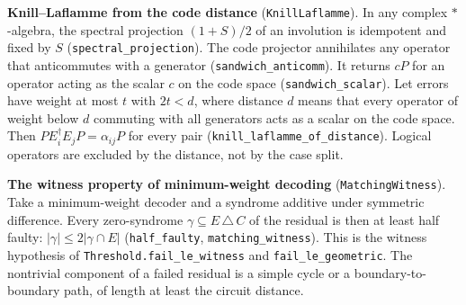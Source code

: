 \documentclass[
]{article}
\begin{document}
\textbf{Knill--Laflamme from the code distance}
(\texttt{KnillLaflamme}). In any complex \(*\)-algebra, the spectral
projection \((1+S)/2\) of an involution is idempotent and fixed by \(S\)
(\texttt{s\allowbreak{}p\allowbreak{}e\allowbreak{}c\allowbreak{}t\allowbreak{}r\allowbreak{}a\allowbreak{}l\allowbreak{}\_\allowbreak{}p\allowbreak{}r\allowbreak{}o\allowbreak{}j\allowbreak{}e\allowbreak{}c\allowbreak{}t\allowbreak{}i\allowbreak{}o\allowbreak{}n}).
The code projector annihilates any operator that anticommutes with a
generator
(\texttt{s\allowbreak{}a\allowbreak{}n\allowbreak{}d\allowbreak{}w\allowbreak{}i\allowbreak{}c\allowbreak{}h\allowbreak{}\_\allowbreak{}a\allowbreak{}n\allowbreak{}t\allowbreak{}i\allowbreak{}c\allowbreak{}o\allowbreak{}m\allowbreak{}m}).
It returns \(cP\) for an operator acting as the scalar \(c\) on the code
space (\texttt{sandwich\_scalar}). Let errors have weight at most \(t\)
with \(2t<d\), where distance \(d\) means that every operator of weight
below \(d\) commuting with all generators acts as a scalar on the code
space. Then \(PE_i^\dagger E_jP=\alpha_{ij}P\) for every pair
(\texttt{k\allowbreak{}n\allowbreak{}i\allowbreak{}l\allowbreak{}l\allowbreak{}\_\allowbreak{}l\allowbreak{}a\allowbreak{}f\allowbreak{}l\allowbreak{}a\allowbreak{}m\allowbreak{}m\allowbreak{}e\allowbreak{}\_\allowbreak{}o\allowbreak{}f\allowbreak{}\_\allowbreak{}d\allowbreak{}i\allowbreak{}s\allowbreak{}t\allowbreak{}a\allowbreak{}n\allowbreak{}c\allowbreak{}e}).
Logical operators are excluded by the distance, not by the case split.

\textbf{The witness property of minimum-weight decoding}
(\texttt{MatchingWitness}). Take a minimum-weight decoder and a syndrome
additive under symmetric difference. Every zero-syndrome
\(\gamma\subseteq E\,\triangle\,C\) of the residual is then at least
half faulty: \(|\gamma|\le2|\gamma\cap E|\) (\texttt{half\_faulty},
\texttt{matching\_witness}). This is the witness hypothesis of
\texttt{T\allowbreak{}h\allowbreak{}r\allowbreak{}e\allowbreak{}s\allowbreak{}h\allowbreak{}o\allowbreak{}l\allowbreak{}d\allowbreak{}.\allowbreak{}f\allowbreak{}a\allowbreak{}i\allowbreak{}l\allowbreak{}\_\allowbreak{}l\allowbreak{}e\allowbreak{}\_\allowbreak{}w\allowbreak{}i\allowbreak{}t\allowbreak{}n\allowbreak{}e\allowbreak{}s\allowbreak{}s}
and
\texttt{f\allowbreak{}a\allowbreak{}i\allowbreak{}l\allowbreak{}\_\allowbreak{}l\allowbreak{}e\allowbreak{}\_\allowbreak{}g\allowbreak{}e\allowbreak{}o\allowbreak{}m\allowbreak{}e\allowbreak{}t\allowbreak{}r\allowbreak{}i\allowbreak{}c}.
The nontrivial component of a failed residual is a simple cycle or a
boundary-to-boundary path, of length at least the circuit distance.
\end{document}
